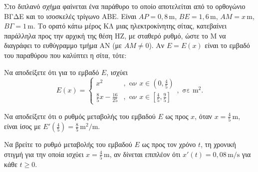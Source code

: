 Στο διπλανό σχήμα φαίνεται ένα παράθυρο το οποίο αποτελείται από το ορθογώνιο ΒΓΔΕ και το ισοσκελές τρίγωνο ΑΒΕ. Είναι $ΑΡ=0,8\,\text{m}$, $ΒΕ=1,6\,\text{m}$, $ΑΜ = x\,\text{m}$, $ΒΓ=1\,\text{m}$. Το ορατό κάτω μέρος ΚΛ μιας ηλεκτροκίνητης σίτας, κατεβαίνει παράλληλα προς την αρχική της θέση ΗΖ, με σταθερό ρυθμό, ώστε το Μ να διαγράφει το ευθύγραμμο τμήμα ΑΝ (με $ΑΜ \neq 0$). Αν $Ε=Ε(x)$ είναι το εμβαδό του παραθύρου που καλύπτει η σίτα, τότε:
\begin{alist}
    \item Να αποδείξετε ότι για το εμβαδό $Ε$, ισχύει
    \[ E(x) = \begin{cases} x^2 & , \text{ αν } x \in \left(0, \frac{4}{5}\right) \\ \frac{8}{5}x - \frac{16}{25} & , \text{ αν } x \in \left[\frac{4}{5}, \frac{9}{5}\right] \end{cases}, \text{ σε m}^2. \]

    \item Να αποδείξετε ότι ο ρυθμός μεταβολής του εμβαδού $Ε$ ως προς $x$, όταν $x=\frac{4}{5}\,\text{m}$, είναι ίσος με $E'\left(\frac{4}{5}\right)=\frac{8}{5}\,\text{m}^2/\text{m}$.

    \item Να βρείτε το ρυθμό μεταβολής του εμβαδού $Ε$ ως προς τον χρόνο $t$, τη χρονική στιγμή για την οποία ισχύει $x=\frac{4}{5}\,\text{m}$, αν δίνεται επιπλέον ότι $x'(t) = 0,08\,\text{m/s}$ για κάθε $t \ge 0$.
\end{alist}